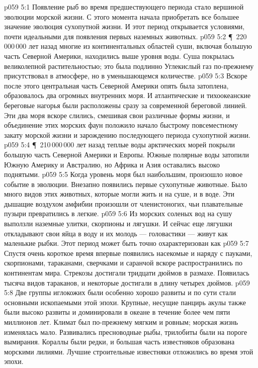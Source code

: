 \vs p059 5:1 Появление рыб во время предшествующего периода стало вершиной эволюции морской жизни. С этого момента начала приобретать все большее значение эволюция сухопутной жизни. И этот период открывается условиями, почти идеальными для появления первых наземных животных.
\vs p059 5:2 \P\ 220\,000\,000 лет назад многие из континентальных областей суши, включая большую часть Северной Америки, находились выше уровня воды. Суша покрылась великолепной растительностью; это была подлинно  Углекислый газ по\hyp{}прежнему присутствовал в атмосфере, но в уменьшающемся количестве.
\vs p059 5:3 Вскоре после этого центральная часть Северной Америки опять была затоплена, образовалось два огромных внутренних моря. И атлантические и тихоокеанские береговые нагорья были расположены сразу за современной береговой линией. Эти два моря вскоре слились, смешивая свои различные формы жизни, и объединение этих морских фаун положило начало быстрому повсеместному закату морской жизни и зарождению последующего периода сухопутной жизни.
\vs p059 5:4 \P\ 210\,000\,000 лет назад теплые воды арктических морей покрыли большую часть Северной Америки и Европы. Южные полярные воды затопили Южную Америку и Австралию, но Африка и Азия оставались высоко поднятыми.
\vs p059 5:5 Когда уровень моря был наибольшим,  произошло новое событие в эволюции. Внезапно появились первые сухопутные животные. Было много видов этих животных, которые могли жить и на суше, и в воде. Эти дышащие воздухом амфибии произошли от членистоногих, чьи плавательные пузыри превратились в легкие.
\vs p059 5:6 Из морских соленых вод на сушу выползли наземные улитки, скорпионы и лягушки. И сейчас еще лягушки откладывают свои яйца в воду и их молодь --- головастики --- живут как маленькие рыбки. Этот период может быть точно охарактеризован как 
\vs p059 5:7 Спустя очень короткое время впервые появились насекомые и наряду с пауками, скорпионами, тараканами, сверчками и саранчой вскоре распространились по континентам мира. Стрекозы достигали тридцати дюймов в размахе. Появилась тысяча видов тараканов, и некоторые достигали в длину четырех дюймов.
\vs p059 5:8 Две группы иглокожих были особенно хорошо развиты и по сути стали основными ископаемыми этой эпохи. Крупные, несущие панцирь акулы также были высоко развиты и доминировали в океане в течение более чем пяти миллионов лет. Климат был по\hyp{}прежнему мягким и ровным; морская жизнь изменялась мало. Развивались пресноводные рыбы, трилобиты были на пороге вымирания. Кораллы были редки, и большая часть известняков образована морскими лилиями. Лучшие строительные известняки отложились во время этой эпохи.
